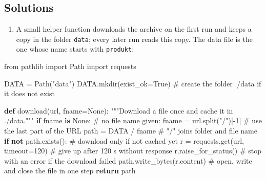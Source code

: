\documentclass[
  letterpaper,
  DIV=11,
  numbers=noendperiod]{scrreprt}
\newenvironment{Shaded}{\begin{snugshade}}{\end{snugshade}}
\newcommand{\CommentTok}[1]{\textcolor[rgb]{0.37,0.37,0.37}{#1}}
\newcommand{\ControlFlowTok}[1]{\textcolor[rgb]{0.00,0.23,0.31}{\textbf{#1}}}
\newcommand{\DecValTok}[1]{\textcolor[rgb]{0.68,0.00,0.00}{#1}}
\newcommand{\ImportTok}[1]{\textcolor[rgb]{0.00,0.46,0.62}{#1}}
\newcommand{\KeywordTok}[1]{\textcolor[rgb]{0.00,0.23,0.31}{\textbf{#1}}}
\newcommand{\NormalTok}[1]{\textcolor[rgb]{0.00,0.23,0.31}{#1}}
\newcommand{\OperatorTok}[1]{\textcolor[rgb]{0.37,0.37,0.37}{#1}}
\newcommand{\StringTok}[1]{\textcolor[rgb]{0.13,0.47,0.30}{#1}}
\newcommand{\VariableTok}[1]{\textcolor[rgb]{0.07,0.07,0.07}{#1}}
\providecommand{\tightlist}{%
  \setlength{\itemsep}{0pt}\setlength{\parskip}{0pt}}\usepackage{longtable,booktabs,array}
\begin{document}
\subsection{Solutions}\label{solutions-2}

\begin{tcolorbox}[enhanced jigsaw, left=2mm, title=\textcolor{quarto-callout-caution-color}{\faFire}\hspace{0.5em}{Solution to Exercise 1}, opacityback=0, breakable, rightrule=.15mm, arc=.35mm, toptitle=1mm, colbacktitle=quarto-callout-caution-color!10!white, opacitybacktitle=0.6, coltitle=black, colframe=quarto-callout-caution-color-frame, bottomrule=.15mm, leftrule=.75mm, bottomtitle=1mm, titlerule=0mm, toprule=.15mm, colback=white]

\begin{enumerate}
\def\labelenumi{(\alph{enumi})}
\tightlist
\item
  A small helper function downloads the archive on the first run and
  keeps a copy in the folder \texttt{data}; every later run reads this
  copy. The data file is the one whose name starts with
  \texttt{produkt}:
\end{enumerate}

\begin{Shaded}
\begin{Highlighting}[]
\ImportTok{from}\NormalTok{ pathlib }\ImportTok{import}\NormalTok{ Path}
\ImportTok{import}\NormalTok{ requests}

\NormalTok{DATA }\OperatorTok{=}\NormalTok{ Path(}\StringTok{"data"}\NormalTok{)}
\NormalTok{DATA.mkdir(exist\_ok}\OperatorTok{=}\VariableTok{True}\NormalTok{)                         }\CommentTok{\# create the folder ./data if it does not exist}

\KeywordTok{def}\NormalTok{ download(url, fname}\OperatorTok{=}\VariableTok{None}\NormalTok{):}
    \CommentTok{"""Download a file once and cache it in ./data."""}
    \ControlFlowTok{if}\NormalTok{ fname }\KeywordTok{is} \VariableTok{None}\NormalTok{:                             }\CommentTok{\# no file name given:}
\NormalTok{        fname }\OperatorTok{=}\NormalTok{ url.split(}\StringTok{"/"}\NormalTok{)[}\OperatorTok{{-}}\DecValTok{1}\NormalTok{]                }\CommentTok{\# use the last part of the URL}
\NormalTok{    path }\OperatorTok{=}\NormalTok{ DATA }\OperatorTok{/}\NormalTok{ fname                           }\CommentTok{\# "/" joins folder and file name}
    \ControlFlowTok{if} \KeywordTok{not}\NormalTok{ path.exists():                         }\CommentTok{\# download only if not cached yet}
\NormalTok{        r }\OperatorTok{=}\NormalTok{ requests.get(url, timeout}\OperatorTok{=}\DecValTok{120}\NormalTok{)        }\CommentTok{\# give up after 120 s without response}
\NormalTok{        r.raise\_for\_status()                      }\CommentTok{\# stop with an error if the download failed}
\NormalTok{        path.write\_bytes(r.content)               }\CommentTok{\# open, write and close the file in one step}
    \ControlFlowTok{return}\NormalTok{ path}
\end{Highlighting}
\end{Shaded}


\end{tcolorbox}
\end{document}

